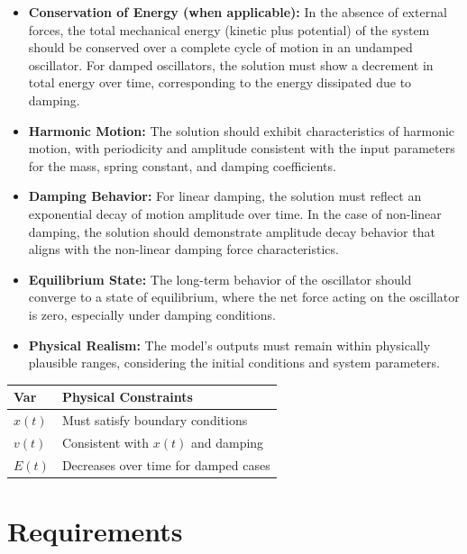 \documentclass[12pt]{article}
\begin{document}
\begin{itemize}
  \item \textbf{Conservation of Energy (when applicable):} In the absence of external 
  forces, the total mechanical energy (kinetic plus potential) of the system 
  should be conserved over a complete cycle of motion in an undamped 
  oscillator. For damped oscillators, the solution must show a decrement in 
  total energy over time, corresponding to the energy dissipated due to damping.
  \item \textbf{Harmonic Motion:} The solution should exhibit characteristics of 
  harmonic motion, with periodicity and amplitude consistent with the input 
  parameters for the mass, spring constant, and damping coefficients.
  \item \textbf{Damping Behavior:} For linear damping, the solution must reflect an 
  exponential decay of motion amplitude over time. In the case of non-linear 
  damping, the solution should demonstrate amplitude decay behavior that 
  aligns with the non-linear damping force characteristics.
  \item \textbf{Equilibrium State:} The long-term behavior of the oscillator should 
  converge to a state of equilibrium, where the net force acting on the 
  oscillator is zero, especially under damping conditions.
  \item \textbf{Physical Realism:} The model's outputs must remain within physically 
  plausible ranges, considering the initial conditions and system parameters.
\end{itemize}

\begin{table}[!h]
\caption{Output Variables} \label{TblOutputVar}
\renewcommand{\arraystretch}{1.2}
\noindent \begin{longtable*}{l l} 
  \toprule
  \textbf{Var} & \textbf{Physical Constraints} \\
  \midrule 
  $x(t)$ & Must satisfy boundary conditions\\
  $v(t)$ & Consistent with $x(t)$ and damping\\
  $E(t)$ & Decreases over time for damped cases\\
  \bottomrule
\end{longtable*}
\end{table}

\section{Requirements}
\end{document}
